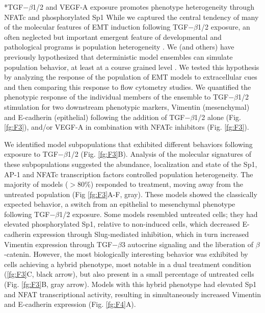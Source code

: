 \documentclass[12pt]{article}
\makeatletter
\renewcommand\subsection{\@startsection
	{subsection}{2}{0mm}
	{-0.05in}
	{-0.5\baselineskip}
	{\normalfont\normalsize\bfseries}}
\makeatother
\begin{document}

\clearpage

\subsection*{TGF$-\beta$1/2 and VEGF-A exposure promotes phenotype heterogeneity through NFATc and phosphorylated Sp1}
While we captured the central tendency of many of the molecular features of EMT induction following TGF$-\beta$1/2 exposure, an often neglected but important emergent
feature of developmental and pathological programs is population heterogeneity \citep{Park:2010fu}.
We (and others) have previously hypothesized that deterministic model ensembles can simulate population behavior, at least at a course grained level \citep{Lequieu:2011fj}.
We tested this hypothesis by analyzing the response of the population of EMT models to extracellular cues and then comparing this response to flow cytometry studies.
We quantified the phenotypic response of the individual members of the ensemble to TGF$-\beta$1/2 stimulation for two downstream phenotypic markers, Vimentin (mesenchymal) and E-cadherin (epithelial) following the addition of TGF$-\beta$1/2 alone (Fig. \ref{fg:F3}), and/or VEGF-A in combination with NFATc inhibitors (Fig. \ref{fg:F3}).

We identified model subpopulations that exhibited different behaviors following exposure to TGF$-\beta$1/2 (Fig. \ref{fg:F3}B).
Analysis of the molecular signatures of these subpopulations suggested the abundance, localization and state of the Sp1, AP-1 and NFATc transcription factors controlled population heterogeneity.
The majority of models ($>$80\%) responded to treatment, moving away from the untreated population (Fig \ref{fg:F3}A-F, gray).
These models showed the classically expected behavior, a switch from an epithelial to mesenchymal phenotype following TGF$-\beta$1/2 exposure.
Some models resembled untreated cells; they had elevated phosphorylated Sp1, relative to non-induced cells,
which decreased E-cadherin expression through Slug-mediated inhibition, which in turn increased Vimentin expression through TGF$-\beta$3 autocrine signaling and the liberation of $\beta$-catenin. However, the most biologically interesting behavior was exhibited by cells achieving a hybrid phenotype, most notable in a dual treatment condition (\ref{fg:F3}C, black arrow), but also present in a small percentage of untreated cells (Fig. \ref{fg:F3}B, gray arrow).
Models with this hybrid phenotype had elevated Sp1 and NFAT transcriptional activity, resulting in simultaneously increased Vimentin and E-cadherin expression (Fig. \ref{fg:F4}A).
\end{document}
